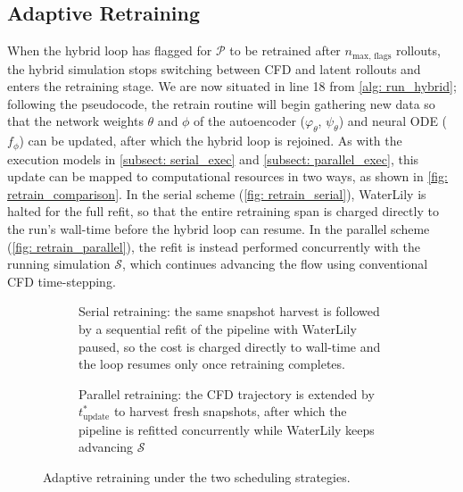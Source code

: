 \subsection{Adaptive Retraining}
\label{subsect: retraining}
When the hybrid loop has flagged for $\mathcal{P}$ to be retrained after $n_\text{max, flags}$ rollouts, the hybrid simulation stops switching between CFD and latent rollouts and enters the retraining stage. We are now situated in line 18 from \autoref{alg: run_hybrid}; following the pseudocode, the retrain routine will begin gathering new data so that the network weights $\theta$ and $\phi$ of the autoencoder ($\varphi_\theta$, $\psi_\theta$) and neural ODE ($f_\phi$) can be updated, after which the hybrid loop is rejoined. As with the execution models in \autoref{subsect: serial_exec} and \autoref{subsect: parallel_exec}, this update can be mapped to computational resources in two ways, as shown in \autoref{fig: retrain_comparison}. In the serial scheme (\autoref{fig: retrain_serial}), WaterLily is halted for the full refit, so that the entire retraining span is charged directly to the run's wall-time before the hybrid loop can resume. In the parallel scheme (\autoref{fig: retrain_parallel}), the refit is instead performed concurrently with the running simulation $\mathcal{S}$, which continues advancing the flow using conventional CFD time-stepping.

\begin{figure}[htbp]
    \centering
     \begin{subfigure}[t]{0.48\textwidth}
         \caption{Serial retraining: the same snapshot harvest is followed by a sequential refit of the pipeline with WaterLily paused, so the cost is charged directly to wall-time and the loop resumes only once retraining completes.}
     \label{fig: retrain_serial}
    \end{subfigure}
    \begin{subfigure}[t]{0.48\textwidth}
        \caption{Parallel retraining: the CFD trajectory is extended by $t^*_\text{update}$ to harvest fresh snapshots, after which the pipeline is refitted concurrently while WaterLily keeps advancing $\mathcal{S}$}
        \label{fig: retrain_parallel}
    \end{subfigure}   
    \caption{Adaptive retraining under the two scheduling strategies.}
    \label{fig: retrain_comparison}
\end{figure}

